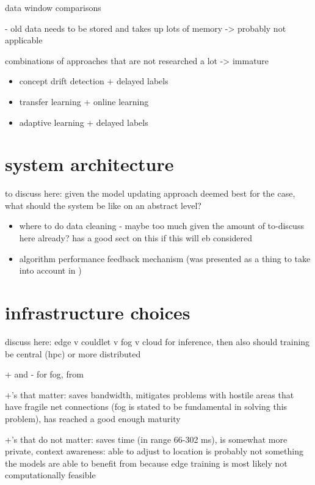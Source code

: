 data window comparisons

- old data needs to be stored and takes up lots of memory \cite{conceptdriftsurvey} -> probably not applicable

combinations of approaches that are not researched a lot -> immature

\begin{itemize}
    \item concept drift detection + delayed labels \cite{mlforstreamingsurvey}
    \item transfer learning + online learning \cite{mlforstreamingsurvey}
    \item adaptive learning + delayed labels \cite{mlforstreamingsurvey}
\end{itemize}

\section{system architecture}

to discuss here: given the model updating approach deemed best for the case, what should the system be like on an abstract level?

\begin{itemize}
    \item where to do data cleaning - maybe too much given the amount of to-discuss here already? \cite{mlforstreamingsurvey} has a good sect on this if this will eb considered
    \item algorithm performance feedback mechanism (was presented as a thing to take into account in \cite{streamminingchallenges})
\end{itemize}

\section{infrastructure choices}

discuss here: edge v couldlet v fog v cloud for inference, then also should training be central (hpc) or more distributed

+ and - for fog, from \cite{fogsurvey}

+'s that matter: saves bandwidth, mitigates problems with hostile areas that have fragile net connections (fog is stated to be fundamental in solving this problem), has reached a good enough maturity

+'s that do not matter: saves time (in range 66-302 ms), is somewhat more private, context awareness: able to adjust to location is probably not something the models are able to benefit from because edge training is most likely not computationally feasible

